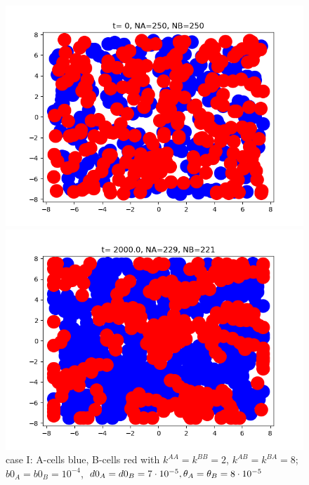 \begin{figure}[htb]
	\begin{minipage}[t]{.45\textwidth}
		\centering
		\includegraphics[width=\textwidth]{micro_caseI_ini3}
	\end{minipage}
	\hfill
	\begin{minipage}[t]{.45\textwidth}
		\centering
		\includegraphics[width=\textwidth]{micro_caseI_fin3}
	\end{minipage}  
	\caption{{case I: A-cells blue, B-cells red with $k^{AA}=k^{BB}=2 $, $k^{AB}=k^{BA}=8$; $b0_A=b0_B=10^{-4}$, $d0_A=d0_B=7\cdot10^{-5}, {\theta}_A={\theta}_B=8\cdot 10^{-5}$}	}
\end{figure}



